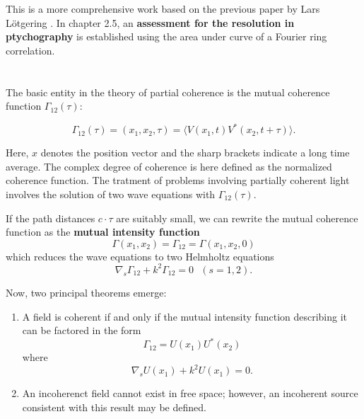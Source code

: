 \documentclass{article}
\newcommand{\newcite}[1] {\section{\cite{#1} \citenum{#1}}}
\begin{document}
This is a more comprehensive work based on the previous paper by Lars Lötgering . In chapter 2.5, an \textbf{assessment for the resolution in ptychography} is established using the area under curve of a Fourier ring correlation.

\newcite{Parrent1966-au}
 
The basic entity in the theory of partial coherence is the mutual coherence function $\Gamma_{12}(\tau)$:

\begin{equation}
      \Gamma_{12}(\tau) = (x_1, x_2, \tau) = \langle V(x_1,t) V^*(x_2, t+\tau)\rangle.
\end{equation}

Here, $x$ denotes the position vector and the sharp brackets indicate a long time average. The complex degree of coherence is here defined as the normalized coherence function. The tratment of problems involving partially coherent light involves the solution of two wave equations with $\Gamma_{12}(\tau)$.

If the path distances $c\cdot \tau$ are suitably small, we can rewrite the mutual coherence function as the \textbf{mutual intensity function}
\begin{equation}
    \Gamma(x_1,x_2) = \Gamma_{12} = \Gamma(x_1,x_2,0)
\end{equation}
which reduces the wave equations to two Helmholtz equations
\begin{equation}
    \nabla_s \Gamma_{12}+k^2\Gamma_{12} = 0 \,\,\,\, (s = 1,2).
\end{equation}

Now, two principal theorems emerge:

\begin{enumerate}
    \item A field is coherent if and only if the mutual intensity function describing it can be factored in the form
    \begin{equation}
        \Gamma_{12} = U(x_1)U^*(x_2)
    \end{equation}
    where 
    \begin{equation}
        \nabla_s U(x_1)+k^2U(x_1) = 0.
    \end{equation}
    \item An incoherenct field cannot exist in free space; however, an incoherent source consistent with this result may be defined.    
\end{enumerate}

\newcite{Thibault2013-kg}
\end{document}
